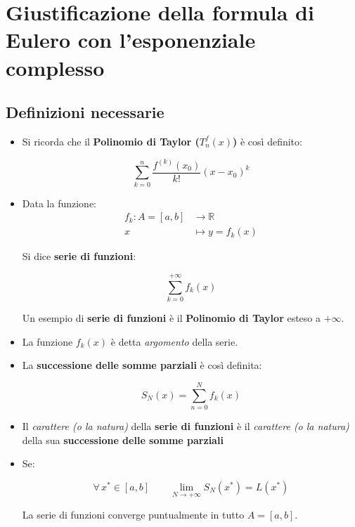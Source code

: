 \documentclass[../dimostrazioni]{subfiles}
\begin{document}
    \chapter{Giustificazione della formula di Eulero con l’esponenziale complesso}
    \label{formulaEulero}

        \section*{Definizioni necessarie}

            \begin{itemize}
                \item Si ricorda che il \textbf{Polinomio di Taylor (\(T _n ^ f (x) \))} è così definito:

                        \[ \sum_{k = 0}^{n} \frac{f^{(k)} (x_0)}{k!}(x-x_0)^k\]
                    
                \item Data la funzione:
                        \begin{align*}
                            f_k : A = [a, b] &\longrightarrow \mathbb{R}\\
                                         x &\longmapsto y = f_k(x) 
                        \end{align*}
    
                        Si dice \textbf{serie di funzioni}:

                        \[  \sum_{k=0}^{+\infty} f_k(x) \]

                        Un esempio di \textbf{serie di funzioni} è il \textbf{Polinomio di Taylor} esteso a \(+\infty\).

                \item La funzione \(f_k(x)\) è detta \emph{argomento} della serie.
                \item La \textbf{successione delle somme parziali} è così definita:
                      
                        \[  S_N (x) = \sum_{n=0}^{N} f_k(x) \]
                    
                \item Il  \emph{carattere (o la natura)} della \textbf{serie di funzioni} è il \emph{carattere (o la natura)} della sua \textbf{successione delle somme parziali}
                \item Se:
                
                        \[  \forall \, x^* \in [a, b] \qquad \lim_{N \to +\infty} S_N (x^*) = L(x^*)    \]

                        La serie di funzioni converge puntualmente in tutto \(A = [a, b]\).
            \end{itemize}
           
\end{document}
